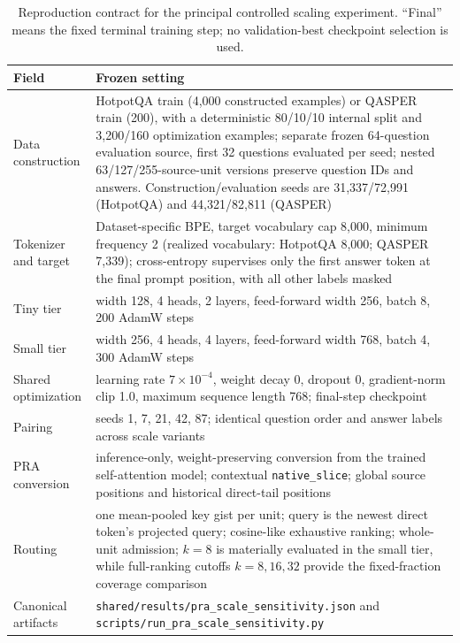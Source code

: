 \documentclass[11pt]{article}
\begin{document}
\begin{table}[H]
\centering
\scriptsize
\caption{Reproduction contract for the principal controlled scaling experiment.
``Final''
means the fixed terminal training step; no validation-best checkpoint selection is
used.}
\label{tab:main-config}
\begin{tabularx}{\textwidth}{P{0.19\textwidth}Y}
\toprule
Field & Frozen setting \\
\midrule
Data construction &
  HotpotQA train (4,000 constructed examples) or QASPER train (200), with a
deterministic 80/10/10 internal split and 3,200/160 optimization examples;
separate frozen
64-question evaluation source, first 32 questions evaluated per seed;
nested 63/127/255-source-unit
versions preserve question IDs and answers. Construction/evaluation seeds are
31,337/72,991
(HotpotQA) and 44,321/82,811 (QASPER) \\
Tokenizer and target &
  Dataset-specific BPE, target vocabulary cap 8,000, minimum frequency 2
(realized vocabulary: HotpotQA 8,000; QASPER 7,339);
cross-entropy supervises only the first
answer token at the final prompt position, with all other labels masked \\
Tiny tier &
  width 128, 4 heads, 2 layers, feed-forward width 256, batch 8, 200 AdamW steps \\
Small tier &
  width 256, 4 heads, 4 layers, feed-forward width 768, batch 4, 300 AdamW steps \\
Shared optimization & learning rate $7\!\times\!10^{-4}$, weight decay 0, dropout 0,
gradient-norm clip 1.0, maximum sequence length 768; final-step checkpoint \\
Pairing &
  seeds 1, 7, 21, 42, 87; identical question order and answer labels across scale
  variants \\
PRA conversion &
  inference-only, weight-preserving conversion from the trained self-attention
model; contextual \texttt{native\_slice}; global source positions and historical
direct-tail positions \\
Routing &
  one mean-pooled key gist per unit; query is the newest direct token's projected query;
cosine-like exhaustive ranking; whole-unit admission;
$k=8$ is materially evaluated in the small
tier, while full-ranking cutoffs $k=8,16,32$ provide the fixed-fraction coverage
comparison \\
Canonical artifacts & \texttt{shared/results/pra\_scale\_sensitivity.json} and
\texttt{scripts/run\_pra\_scale\_sensitivity.py} \\
\bottomrule
\end{tabularx}
\end{table}
\end{document}
